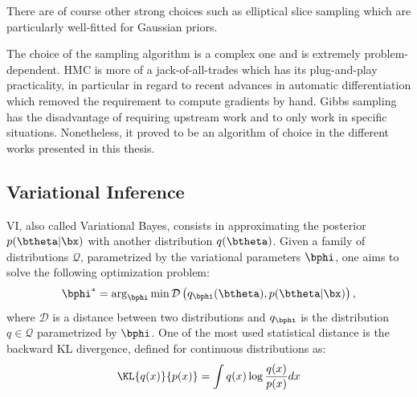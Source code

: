 There are of course other strong choices such as elliptical slice sampling \citet{murray2010elliptical} which are particularly well-fitted for Gaussian priors.

The choice of the sampling algorithm is a complex one and is extremely problem-dependent.
\ac{HMC} is more of a jack-of-all-trades which has its plug-and-play practicality, in particular in regard to recent advances in automatic differentiation which removed the requirement to compute gradients by hand.
Gibbs sampling has the disadvantage of requiring upstream work and to only work in specific situations.
Nonetheless, it proved to be an algorithm of choice in the different works presented in this thesis.





\subsection{Variational Inference}

\acf{VI}, also called Variational Bayes, consists in approximating the posterior $p(\btheta|\bx)$ with another distribution $q(\btheta)$.
Given a family of distributions $\mathcal{Q}$, parametrized by the variational parameters $\bphi$, one aims to solve the following optimization problem:
\begin{align}
\bphi^* = \arg_{\bphi}\min \mathcal{D}\left(q_{\bphi}(\btheta), p(\btheta|\bx)\right),
\label{eq:prob_VI}
\end{align}
where $\mathcal{D}$ is a distance between two distributions and $q_{\bphi}$ is the distribution $q\in \mathcal{Q}$ parametrized by $\bphi$.
One of the most used statistical distance is the backward \ac{KL} divergence, defined for continuous distributions as:
\begin{align}
\KL{q(x)}{p(x)} = \int q(x) \log \frac{q(x)}{p(x)}dx
\label{eq:kl}
\end{align}

